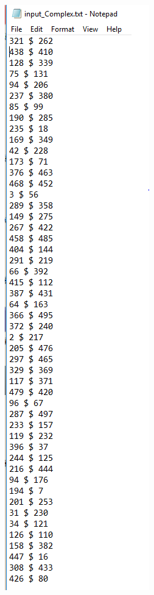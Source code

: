 \documentclass[12pt, titlepage]{article}
\begin{document}
\begin{enumerate}
\begin{figure}[h!]
\centering
\begin{minipage}[b]{0.4\textwidth}
 \includegraphics[width=\textwidth]{Input_complex}

\end{minipage}
\end{figure}
\end{enumerate}
\end{document}
